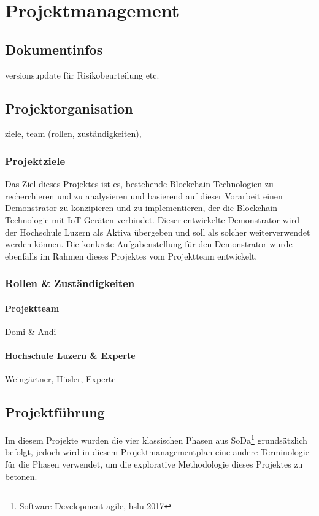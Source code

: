 \chapter{Projektmanagement}

\section{Dokumentinfos}
versionsupdate für Risikobeurteilung etc.

\section{Projektorganisation}
ziele, team (rollen, zuständigkeiten), 
\subsection{Projektziele}
Das Ziel dieses Projektes ist es, bestehende Blockchain Technologien zu recherchieren und zu analysieren und basierend auf dieser Vorarbeit einen Demonstrator zu konzipieren und zu implementieren, der die Blockchain Technologie mit IoT Geräten verbindet. Dieser entwickelte Demonstrator wird der Hochschule Luzern als Aktiva übergeben und soll als solcher weiterverwendet werden können. Die konkrete Aufgabenstellung für den Demonstrator wurde ebenfalls im Rahmen dieses Projektes vom Projektteam entwickelt.

\subsection{Rollen \& Zuständigkeiten}
\subsubsection{Projektteam}
Domi \& Andi

\subsubsection{Hochschule Luzern \& Experte}
Weingärtner, Hüsler, Experte

\section{Projektführung}
Im diesem Projekte wurden die vier klassischen Phasen aus SoDa\footnote{Software Development agile, hslu 2017} grundsätzlich befolgt, jedoch wird in diesem Projektmanagementplan eine andere Terminologie für die Phasen verwendet, um die explorative Methodologie dieses Projektes zu betonen.

